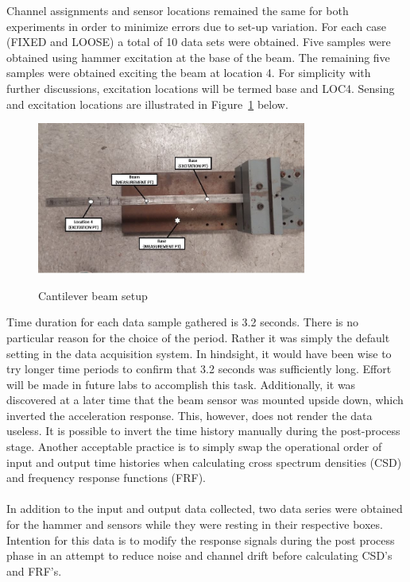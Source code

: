 \documentclass[paper=a4, fontsize=12pt]{scrartcl} %
\begin{document}
%
Channel assignments and sensor locations remained the same for both experiments in order to minimize errors due to set-up variation. For each case (FIXED and LOOSE) a total of 10 data sets were obtained. Five samples were obtained using hammer excitation at the base of the beam. The remaining five samples were obtained exciting the beam at location 4. For simplicity with further discussions, excitation locations will be termed base and LOC4. Sensing and excitation locations are illustrated in Figure~\ref{fig:TopShot_mod} below.
%
	\begin{figure}[H]
		\centering
		{
		\includegraphics[height=5.0cm]{TopShot_mod.jpg}
		}
		\caption{Cantilever beam setup}
		\label{fig:TopShot_mod}
	\end{figure}
%
Time duration for each data sample gathered is 3.2 seconds. There is no particular reason for the choice of the period. Rather it was simply the default setting in the data acquisition system. In hindsight, it would have been wise to try longer time periods to confirm that 3.2 seconds was sufficiently long. Effort will be made in future labs to accomplish this task. Additionally, it was discovered at a later time that the beam sensor was mounted upside down, which inverted the acceleration response. This, however, does not render the data useless. It is possible to invert the time history manually during the post-process stage. Another acceptable practice is to simply swap the operational order of input and output time histories when calculating cross spectrum densities (CSD) and frequency response functions (FRF).
\\
\\
In addition to the input and output data collected, two data series were obtained for the hammer and sensors while they were resting in their respective boxes. Intention for this data is to modify the response signals during the post process phase in an attempt to reduce noise and channel drift before calculating CSD's and FRF's.
%
%
\end{document}
